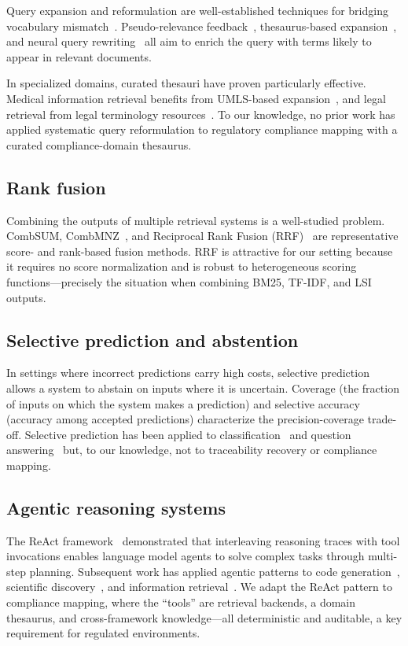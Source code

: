 \documentclass[a4paper,fleqn]{cas-sc}
\begin{document}
Query expansion and reformulation are well-established techniques for bridging vocabulary mismatch~\citep{Carpineto2012}.
Pseudo-relevance feedback~\citep{Rocchio1971}, thesaurus-based expansion~\citep{Voorhees1994}, and neural query rewriting~\citep{Nogueira2019} all aim to enrich the query with terms likely to appear in relevant documents.

In specialized domains, curated thesauri have proven particularly effective.
Medical information retrieval benefits from UMLS-based expansion~\citep{Aronson2010}, and legal retrieval from legal terminology resources~\citep{Maxwell2017}.
To our knowledge, no prior work has applied systematic query reformulation to regulatory compliance mapping with a curated compliance-domain thesaurus.

\subsection{Rank fusion}

Combining the outputs of multiple retrieval systems is a well-studied problem.
CombSUM, CombMNZ~\citep{Fox1994}, and Reciprocal Rank Fusion (RRF)~\citep{Cormack2009} are representative score- and rank-based fusion methods.
RRF is attractive for our setting because it requires no score normalization and is robust to heterogeneous scoring functions---precisely the situation when combining BM25, TF-IDF, and LSI outputs.

\subsection{Selective prediction and abstention}

In settings where incorrect predictions carry high costs, selective prediction~\citep{ElYaniv2010,Geifman2017} allows a system to abstain on inputs where it is uncertain.
Coverage (the fraction of inputs on which the system makes a prediction) and selective accuracy (accuracy among accepted predictions) characterize the precision-coverage trade-off.
Selective prediction has been applied to classification~\citep{Geifman2019} and question answering~\citep{Kamath2020} but, to our knowledge, not to traceability recovery or compliance mapping.

\subsection{Agentic reasoning systems}

The ReAct framework~\citep{Yao2023} demonstrated that interleaving reasoning traces with tool invocations enables language model agents to solve complex tasks through multi-step planning.
Subsequent work has applied agentic patterns to code generation~\citep{Yang2024}, scientific discovery~\citep{Bran2024}, and information retrieval~\citep{Shao2024}.
We adapt the ReAct pattern to compliance mapping, where the ``tools'' are retrieval backends, a domain thesaurus, and cross-framework knowledge---all deterministic and auditable, a key requirement for regulated environments.
\end{document}
